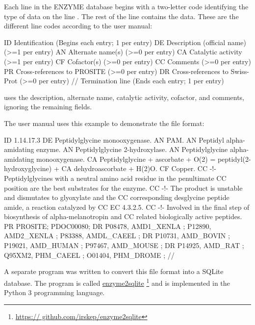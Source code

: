 Each line in the ENZYME database begins with a two-letter code identifying the
type of data on the line \cite{enzyme:enzuser}. The rest of the line contains
the data. These are the different line codes according to the user manual:

\begin{objc}
ID  Identification                         (Begins each entry;
                                            1 per entry)
DE  Description (official name)            (>=1 per entry)
AN  Alternate name(s)                      (>=0 per entry)
CA  Catalytic activity                     (>=1 per entry)
CF  Cofactor(s)                            (>=0 per entry)
CC  Comments                               (>=0 per entry)
PR  Cross-references to PROSITE            (>=0 per entry)
DR  Cross-references to Swiss-Prot         (>=0 per entry)
//  Termination line                       (Ends each entry;
                                            1 per entry)
\end{objc}

\keggapp uses the description, alternate name, catalytic activity, cofactor, and
comments, ignoring the remaining fields.

The user manual uses this example to demonstrate the file format:

\begin{objc}
ID   1.14.17.3
DE   Peptidylglycine monooxygenase.
AN   PAM.
AN   Peptidyl alpha-amidating enzyme.
AN   Peptidylglycine 2-hydroxylase.
AN   Peptidylglycine alpha-amidating monooxygenase.
CA   Peptidylglycine + ascorbate + O(2) = peptidyl(2-hydroxyglycine) +
CA   dehydroascorbate + H(2)O.
CF   Copper.
CC   -!- Peptidylglycines with a neutral amino acid residue in the penultimate
CC       position are the best substrates for the enzyme.
CC   -!- The product is unstable and dismutates to glyoxylate and the
CC       corresponding desglycine peptide amide, a reaction catalyzed by
CC       EC 4.3.2.5.
CC   -!- Involved in the final step of biosynthesis of alpha-melanotropin and
CC       related biologically active peptides.
PR   PROSITE; PDOC00080;
DR   P08478, AMD1_XENLA ;  P12890, AMD2_XENLA ;  P83388, AMDL_CAEEL ;
DR   P10731, AMD_BOVIN  ;  P19021, AMD_HUMAN  ;  P97467, AMD_MOUSE  ;
DR   P14925, AMD_RAT    ;  Q95XM2, PHM_CAEEL  ;  O01404, PHM_DROME  ;
//
\end{objc}

A separate program was written to convert this file format into a SQLite
database. The program is called
\href{https://github.com/irskep/enzyme2sqlite}{enzyme2sqlite}
\footnote{\href{https://github.com/irskep/enzyme2sqlite}{https:/\slash
github.com\slash irskep\slash enzyme2sqlite}} and is implemented in the Python
3 programming language.

